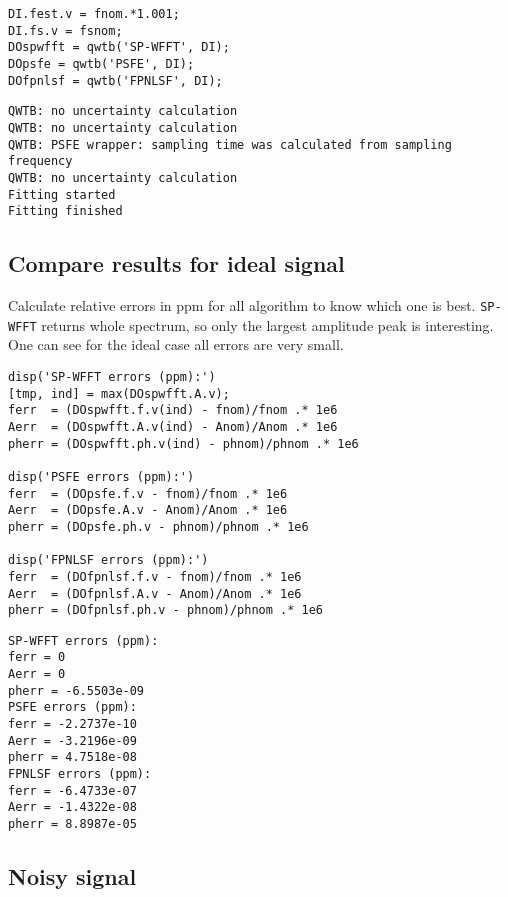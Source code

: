 \begin{lstlisting}
DI.fest.v = fnom.*1.001;
DI.fs.v = fsnom;
DOspwfft = qwtb('SP-WFFT', DI);
DOpsfe = qwtb('PSFE', DI);
DOfpnlsf = qwtb('FPNLSF', DI);
\end{lstlisting}
\begin{lstlisting}[language={},xleftmargin=5pt,frame=none]
QWTB: no uncertainty calculation
QWTB: no uncertainty calculation
QWTB: PSFE wrapper: sampling time was calculated from sampling frequency
QWTB: no uncertainty calculation
Fitting started
Fitting finished

\end{lstlisting}


{}
\subsection*{Compare results for ideal signal}



Calculate relative errors in ppm for all algorithm to know which one is best.
\texttt{SP-WFFT} returns whole spectrum, so only the largest amplitude peak is
interesting. One can see for the ideal case all errors are very small.

\begin{lstlisting}
disp('SP-WFFT errors (ppm):')
[tmp, ind] = max(DOspwfft.A.v);
ferr  = (DOspwfft.f.v(ind) - fnom)/fnom .* 1e6
Aerr  = (DOspwfft.A.v(ind) - Anom)/Anom .* 1e6
pherr = (DOspwfft.ph.v(ind) - phnom)/phnom .* 1e6

disp('PSFE errors (ppm):')
ferr  = (DOpsfe.f.v - fnom)/fnom .* 1e6
Aerr  = (DOpsfe.A.v - Anom)/Anom .* 1e6
pherr = (DOpsfe.ph.v - phnom)/phnom .* 1e6

disp('FPNLSF errors (ppm):')
ferr  = (DOfpnlsf.f.v - fnom)/fnom .* 1e6
Aerr  = (DOfpnlsf.A.v - Anom)/Anom .* 1e6
pherr = (DOfpnlsf.ph.v - phnom)/phnom .* 1e6
\end{lstlisting}
\begin{lstlisting}[language={},xleftmargin=5pt,frame=none]
SP-WFFT errors (ppm):
ferr = 0
Aerr = 0
pherr = -6.5503e-09
PSFE errors (ppm):
ferr = -2.2737e-10
Aerr = -3.2196e-09
pherr = 4.7518e-08
FPNLSF errors (ppm):
ferr = -6.4733e-07
Aerr = -1.4322e-08
pherr = 8.8987e-05

\end{lstlisting}


{}
\subsection*{Noisy signal}



